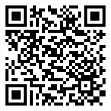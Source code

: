 \documentclass{beamer}
\begin{document}
\begin{columns}
\begin{column}{0.1\textwidth}
        \centering%
        \includegraphics[width=\linewidth]{img/paper_qr}
    \end{column}
\end{columns}

\vspace{3em}

\end{document}
